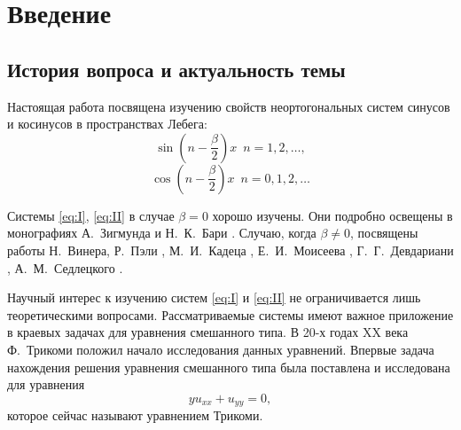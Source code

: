 ﻿\documentclass[oneside, final, 14pt]{extreport}
\begin{document}
\newcommand\sincoeffs{\int\limits_0^{\pi}\sin(n - \frac{\beta}{2})xdx,
	\enspace n = 1, 2, \dots}
\newcommand\sinCNull{\int\limits_0^{\pi}f(x)\sin(n - \frac{\beta}{2})xdx = 0,
	\enspace n = 1, 2, \dots}
\newcommand\mainFunc{f_0(x) = (\cos\frac{x}{2})^{-\beta-1}\sin\frac{x}{2}}
\newcommand\msin[1]{\sin(n - \frac{\beta}{2})#1}
\newcommand\msindots[1]{\sin(n - \frac{\beta}{2})#1, n = 1, 2, \ldots}
\newcommand\mcos[1]{\cos(n - \frac{\beta}{2})#1}
\newcommand\mCoeff{n - \frac{\beta}{2}}
\newcommand\Real{\operatorname{Re}}
\newcommand\Imag{\operatorname{Im}}
\newcommand\pv[1]{\mathrel{\stackrel{\makebox[0pt]{\mbox{\normalfont\tiny п.в.}}}{#1}}}
\newcommand\phisys[2]{\{\phi_#1(#2)\}}
\newcommand\bsin[1]{h_n^s(#1)=\frac{2}{\pi}\sum\limits_{k = 0}^{n - 1}C_{\beta}^k\sin(n - k)#1\bigl(2\cos(\frac{\theta}{2} )\bigr)^{-\beta}}





\setcounter{chapter}{1}
\chapter*{Введение}

\section{История вопроса и актуальность темы}
Настоящая работа посвящена изучению свойств неортогональных систем синусов и косинусов в пространствах Лебега:
\begin{equation}
	\msin{x} \enspace n = 1, 2, \dots, \tag{I}\label{eq:I}
\end{equation}
\begin{equation}
	\mcos{x} \enspace n = 0, 1, 2, \dots \tag{II}\label{eq:II}
\end{equation}

Системы \eqref{eq:I}, \eqref{eq:II} в случае $\beta = 0$ хорошо изучены. Они подробно освещены в монографиях
А.~Зигмунда \cite{zigmund} и Н.~К.~Бари \cite{bari}. Случаю, когда $\beta \neq 0$, посвящены работы 
Н.~Винера, Р.~Пэли \cite{paley-wiener}, М.~И.~Кадеца \cite{kadec}, Е.~И.~Моисеева \cite{moiseev-dan}, 
Г.~Г.~Девдариани \cite{devdariani}, А.~М.~Седлецкого \cite{moiseev-sedleckiy}.

Научный интерес к изучению систем \eqref{eq:I} и \eqref{eq:II} не ограничивается лишь теоретическими вопросами. 
Рассматриваемые системы имеют важное приложение в краевых задачах для уравнения смешанного типа.
В 20-х годах XX века Ф.~Трикоми \cite{trikomi} положил начало исследования данных уравнений. 
Впервые задача нахождения решения уравнения смешанного типа была поставлена и исследована для уравнения
$$yu_{xx} + u_{yy} = 0,$$
которое сейчас называют уравнением Трикоми.
\end{document}
